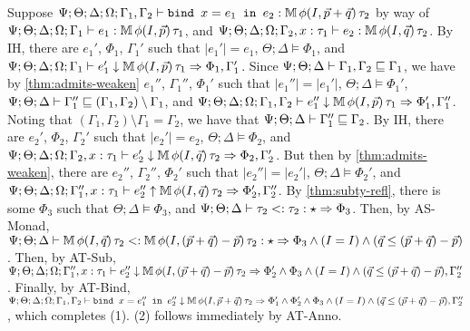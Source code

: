 \iffalse
  \item[(T-Bind)] 
  Suppose $\Psi ; \Theta ; \Delta ; \Omega ; \Gamma_1,\Gamma_2 \vdash \texttt{bind } x = e_1 \texttt{ in } e_2 : \mathbb{M} \, \phi(I,\vec{p} + \vec{q})\, \tau_2$ by way of
  $\Psi ; \Theta ; \Delta ; \Omega ; \Gamma_1 \vdash e_1 : \mathbb{M} \, \phi(I,\vec{p})\, \tau_1$, and
  $\Psi ; \Theta; \Delta ; \Omega ; \Gamma_2, x:\tau_1 \vdash e_2 : \mathbb{M} \, \phi(I,\vec{q})\, \tau_2$.
  By IH, there are $e_1'$, $\Phi_1$, $\Gamma_1'$ such that
  $|e_1'| = e_1$,
  $\Theta ; \Delta \vDash \Phi_1$, and
  $\Psi  ; \Theta ; \Delta ; \Omega ; \Gamma_1 \vdash e_1' \downarrow \mathbb{M} \, \phi(I,\vec{p}) \, \tau_1 \Rightarrow \Phi_1,\Gamma_1'$.
  Since $\Psi ; \Theta ; \Delta \vdash \Gamma_1,\Gamma_2 \sqsubseteq \Gamma_1$,
  we have by \autoref{thm:admits-weaken} $e_1''$, $\Gamma_1''$, $\Phi_1'$ such that
  $|e_1''| = |e_1'|$,
  $\Theta ; \Delta \vDash \Phi_1'$,
  $\Psi ; \Theta ; \Delta \vdash \Gamma_1'' \sqsubseteq (\Gamma_1,\Gamma_2) \setminus \Gamma_1$, and
  $\Psi ; \Theta ; \Delta ; \Omega ; \Gamma_1,\Gamma_2 \vdash e_1'' \downarrow \mathbb{M} \, \phi(I,\vec{p}) \, \tau_1 \Rightarrow \Phi_1',\Gamma_1''$.
  Noting that $(\Gamma_1,\Gamma_2) \setminus \Gamma_1 = \Gamma_2$, we have that
  $\Psi ; \Theta ; \Delta \vdash \Gamma_1'' \sqsubseteq \Gamma_2$.
  By IH, there are $e_2'$, $\Phi_2$, $\Gamma_2'$ such that
  $|e_2'| = e_2$,
  $\Theta ; \Delta \vDash \Phi_2$, and
  $\Psi ; \Theta; \Delta ; \Omega ; \Gamma_2, x:\tau_1 \vdash e_2' \downarrow \mathbb{M} \, \phi(I,\vec{q})\, \tau_2 \Rightarrow \Phi_2,\Gamma_2'$.
  But then by \autoref{thm:admits-weaken}, there are $e_2''$, $\Gamma_2''$, $\Phi_2'$ such that
  $|e_2''| = |e_2'|$,
  $\Theta ; \Delta \vDash \Phi_2'$, and
  $\Psi ; \Theta ; \Delta ; \Omega ; \Gamma_1'', x : \tau_1 \vdash e_2'' \uparrow \mathbb{M} \, \phi(I,\vec{q}) \, \tau_2 \Rightarrow \Phi_2',\Gamma_2''$.
  By \autoref{thm:subty-refl}, there is some $\Phi_3$ such that $\Theta ; \Delta \vDash \Phi_3$, and
  $\Psi ; \Theta ; \Delta \vdash \tau_2 <: \tau_2 : \star \Rightarrow \Phi_3$.
  Then, by AS-Monad, $\Psi ; \Theta ; \Delta \vdash \mathbb{M} \, \phi(I,\vec{q}) \, \tau_2 <: \mathbb{M} \, \phi(I,(\vec{p} + \vec{q}) - \vec{p}) \, \tau_2 : \star \Rightarrow \Phi_3 \wedge (I = I) \wedge (\vec{q} \leq (\vec{p} + \vec{q}) - \vec{p})$.
  Then, by AT-Sub,
  $\Psi ; \Theta ; \Delta ; \Omega ; \Gamma_1'', x : \tau_1 \vdash e_2'' \downarrow \mathbb{M} \, \phi(I,(\vec{p} + \vec{q}) - \vec{p}) \, \tau_2 \Rightarrow \Phi_2' \wedge  \Phi_3 \wedge (I = I) \wedge (\vec{q} \leq (\vec{p} + \vec{q}) - \vec{p}),\Gamma_2''$.
  Finally, by AT-Bind,
  $\Psi ; \Theta ; \Delta ; \Omega ; \Gamma_1,\Gamma_2 \vdash \texttt{bind } x = e_1'' \texttt{ in } e_2'' \downarrow \mathbb{M} \, \phi(I,\vec{p} + \vec{q})\, \tau_2 \Rightarrow \Phi_1' \wedge \Phi_2' \wedge \Phi_3 \wedge (I = I) \wedge (\vec{q} \leq (\vec{p} + \vec{q}) - \vec{p}), \Gamma_2''$, which completes (1). (2) follows immediately by AT-Anno.
  
